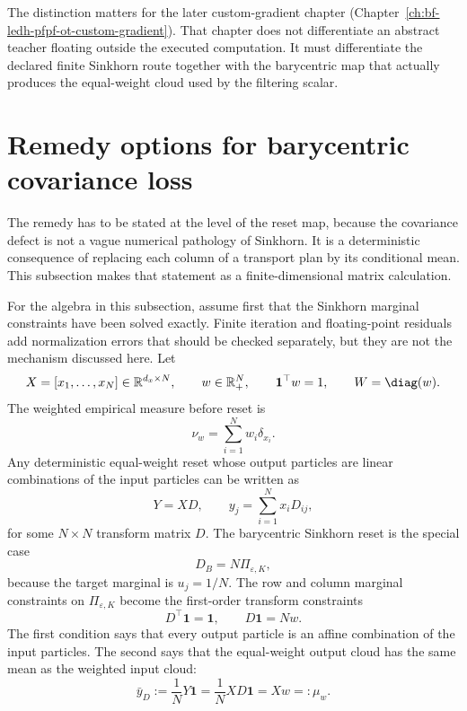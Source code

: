The distinction matters for the later custom-gradient chapter
(Chapter~\ref{ch:bf-ledh-pfpf-ot-custom-gradient}).  That chapter does not
differentiate an abstract teacher floating outside the executed computation.  It
must differentiate the declared finite Sinkhorn route together with the barycentric
map that actually produces the equal-weight cloud used by the filtering scalar.

\section{Remedy options for barycentric covariance loss}
\label{sec:bf-eot-barycentric-remedies}

The remedy has to be stated at the level of the reset map, because the
covariance defect is not a vague numerical pathology of Sinkhorn.  It is a
deterministic consequence of replacing each column of a transport plan by its
conditional mean.  This subsection makes that statement as a finite-dimensional
matrix calculation.

For the algebra in this subsection, assume first that the Sinkhorn marginal
constraints have been solved exactly.  Finite iteration and floating-point
residuals add normalization errors that should be checked separately, but they
are not the mechanism discussed here.  Let
\[
  X = [x_1,\ldots,x_N]\in\mathbb R^{d_x\times N},
  \qquad
  w\in\mathbb R^N_+,\qquad
  \mathbf 1^\top w=1,
  \qquad
  W=\diag(w).
\]
The weighted empirical measure before reset is
\[
  \nu_w=\sum_{i=1}^N w_i\delta_{x_i}.
\]
Any deterministic equal-weight reset whose output particles are linear
combinations of the input particles can be written as
\begin{equation}
\label{eq:bf-eot-reset-transform}
  Y = XD,
  \qquad
  y_j=\sum_{i=1}^N x_i D_{ij},
\end{equation}
for some \(N\times N\) transform matrix \(D\).  The barycentric Sinkhorn reset is
the special case
\begin{equation}
\label{eq:bf-eot-barycentric-D}
  D_B = N\Pi_{\varepsilon,K},
\end{equation}
because the target marginal is \(u_j=1/N\).  The row and column marginal
constraints on \(\Pi_{\varepsilon,K}\) become the first-order transform
constraints
\begin{equation}
\label{eq:bf-eot-first-order-transform-contract}
  D^\top \mathbf 1 = \mathbf 1,
  \qquad
  D\mathbf 1 = Nw.
\end{equation}
The first condition says that every output particle is an affine combination of
the input particles.  The second says that the equal-weight output cloud has the
same mean as the weighted input cloud:
\begin{equation}
\label{eq:bf-eot-transform-mean}
  \bar y_D
  :=
  \frac1N Y\mathbf 1
  =
  \frac1N XD\mathbf 1
  =
  Xw
  =:
  \mu_w.
\end{equation}

